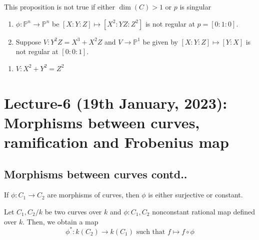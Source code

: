 \documentclass[oneside, 12pt]{scrbook}
\newcommand{\PP}{\mathbb{P}}
\theoremstyle{theorem}
\begin{document}
\begin{remark}
This proposition is not true if either $\dim(C) > 1$ or $p$ is singular 
\begin{enumerate}
\item $\phi: \PP^n \rightarrow \PP^n$ be $[X:Y:Z] \mapsto [X^2 : YZ : Z^2]$ is not regular at $p = [0:1:0]$.
\item Suppose $V : Y^2 Z = X^3 + X^2 Z$ and $V \rightarrow \PP^1$ be given by $[X:Y:Z] \mapsto [Y:X]$ is not regular at $[0:0:1]$.
\end{enumerate}
\end{remark}

\begin{example}
\begin{enumerate}
\item $V: X^2 + Y^2 = Z^2$
\end{enumerate}
\end{example}


\chapter{Lecture-6 (19th January, 2023): Morphisms between curves, ramification and Frobenius map}

\section{Morphisms between curves contd..}

\begin{theorem}
If $\phi: C_{1} \rightarrow C_{2}$ are morphisms of curves, then $\phi$ is either surjective or constant.
\end{theorem}

Let $C_{1},C_{2}/k$ be two curves over $k$ and $\phi: C_{1},C_{2}$ nonconstant rational map defined over $k$. Then, we obtain a map 
\begin{equation*}
\phi^* : k(C_{2}) \rightarrow k(C_{1}) \text{ such that } f \mapsto f \circ \phi
\end{equation*} 
\end{document}
